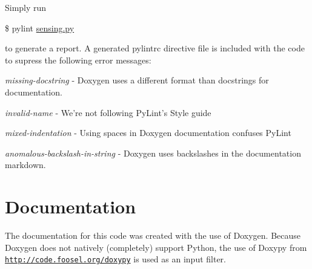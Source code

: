 Simply run

\$ pylint \hyperlink{sensing_8py}{sensing.\-py}

to generate a report. A generated pylintrc directive file is included with the code to supress the following error messages\-:

{\itshape missing-\/docstring} -\/ Doxygen uses a different format than docstrings for documentation.

{\itshape invalid-\/name} -\/ We're not following Py\-Lint's Style guide

{\itshape mixed-\/indentation} -\/ Using spaces in Doxygen documentation confuses Py\-Lint

{\itshape anomalous-\/backslash-\/in-\/string} -\/ Doxygen uses backslashes in the documentation markdown.\hypertarget{index_documents}{}\section{Documentation}\label{index_documents}
The documentation for this code was created with the use of Doxygen. Because Doxygen does not natively (completely) support Python, the use of Doxypy from \href{http://code.foosel.org/doxypy}{\tt http\-://code.\-foosel.\-org/doxypy} is used as an input filter. 